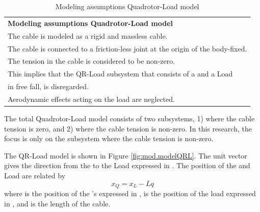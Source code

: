 \begin{table}[h!]
	\centering
	\begin{tabular}{|p{\textwidth}|}
		\hline 		\vspace{0.1mm}
		\textbf{Modeling assumptions Quadrotor-Load model}\\ 	\vspace{0.1mm}		
		\tabitem The cable is modeled as a rigid and massless cable. \\
		\tabitem The cable is connected to a friction-less joint at the origin of the body-fixed. \\
		\tabitem The tension in the cable is considered to be non-zero.\\
		\hspace{4mm} This implies that the QR-Load subsystem that consists of a \a{qr} and a Load\\
		\hspace{4mm} in free fall, is disregarded.\\		 
		\tabitem Aerodynamic effects acting on the load are neglected.\\
		\hline
	\end{tabular}
	\caption{Modeling assumptions Quadrotor-Load model}
	\label{tab:mod.assumptionsQRL}
\end{table}
The total Quadrotor-Load model consists of two subsystems, 1) where the cable tension is zero, and 2) where the cable tension is non-zero.
In this research, the focus is only on the subsystem where the cable tension is non-zero.

The QR-Load model is shown in Figure \ref{fig:mod.modelQRL}. The unit vector  gives the direction from the  to the Load expressed in \BF. The position of the  and Load are related by
\begin{equation}\label{eq:mod.xQ2xL}
x_Q=x_L-Lq
\end{equation}
where  is the position of the 's  expressed in \IF,  is the position of the load expressed in \IF, and  is the length of the cable.

